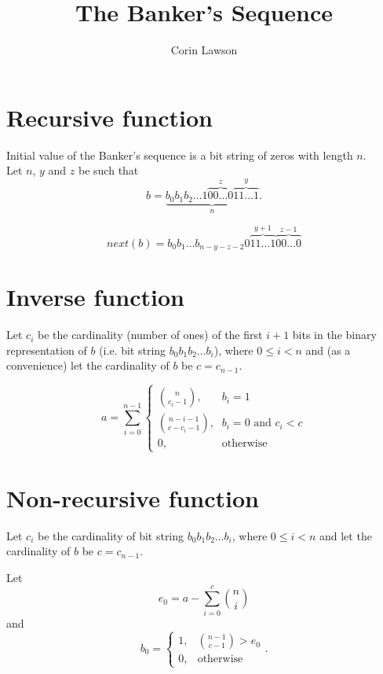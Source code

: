 \documentclass[a4paper,12pt]{article}
\author{Corin Lawson}
\title{The Banker's Sequence}
\begin{document}
\maketitle

\section{Recursive function}

Initial value of the Banker's sequence is a bit string of zeros with length $n$.\\

Let $n$, $y$ and $z$ be such that 
$$b = \underbrace{b_0b_1b_2\ldots1\overbrace{00\ldots0}^z\overbrace{11\ldots1}^y}_n.$$

\begin{equation}
next(b)=
b_0b_1\ldots b_{n-y-z-2}0\overbrace{11\ldots1}^{y+1}\overbrace{00\ldots0}^{z-1}
\end{equation}

\section{Inverse function}

Let $c_i$ be the cardinality (number of ones) of the first $i+1$ bits in the
binary representation of $b$ (i.e. bit string $b_0b_1b_2\ldots b_i$),
where $0 \leq i < n$ and (as a convenience) let the cardinality of $b$ be $c=c_{n-1}$.

\begin{equation}
a = \sum_{i=0}^{n-1}
    \begin{cases}
        \binom{n}{c_i-1}\text{,} & b_i=1\\
        \binom{n-i-1}{c-c_i-1}\text{,} & b_i=0 \text{ and } c_i < c\\
        0, & \text{otherwise}
    \end{cases}
\end{equation}

\pagebreak

\section{Non-recursive function}

Let $c_i$ be the cardinality of bit string $b_0b_1b_2\ldots b_i$,
where $0 \leq i < n$ and let the cardinality of $b$ be $c=c_{n-1}$.

Let
\begin{equation}
    e_0=a-\sum\limits_{i=0}^{c}\binom{n}{i}
\end{equation}
and
\begin{equation}
    b_0=\begin{cases}
        1, & \binom{n-1}{c-1} > e_0 \\
        0, & \text{otherwise}
    \end{cases}.
\end{equation}
\end{document}
